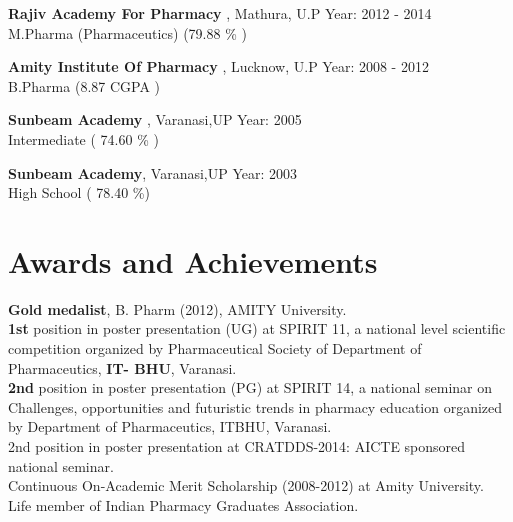 \documentclass[margin,line]{res}
\begin{document}
\begin{resume}
{\bf Rajiv Academy For Pharmacy} , Mathura, U.P \hfill Year: 2012 - 2014\\
M.Pharma (Pharmaceutics) \hfill(79.88 \% )

{\bf Amity Institute Of Pharmacy} , Lucknow, U.P \hfill Year: 2008 - 2012\\
B.Pharma \hfill(8.87 CGPA )

{\bf Sunbeam Academy }, Varanasi,UP \hfill Year: 2005 \\
Intermediate \hfill( 74.60 \% )

{\bf Sunbeam Academy}, Varanasi,UP \hfill Year: 2003 \\
High School \hfill( 78.40 \%)
\\






\section{\sc Awards and Achievements}
\setlength{\parskip}{10pt plus 1pt minus 1pt}

{\bf Gold medalist}, B. Pharm (2012), AMITY University.\vspace{1mm}\\
{\bf 1st} position in poster presentation (UG) at SPIRIT 11, a national level scientiﬁc competition organized by Pharmaceutical Society of Department of Pharmaceutics, {\bf IT- BHU}, Varanasi.\vspace{1mm}\\
{\bf 2nd} position in poster presentation (PG) at SPIRIT 14, a national seminar on Challenges, opportunities and futuristic trends in pharmacy education organized by Department of Pharmaceutics, ITBHU, Varanasi.\vspace{1mm}\\
2nd position in poster presentation at CRATDDS-2014: AICTE sponsored national seminar.\vspace{1mm}\\
Continuous On-Academic Merit Scholarship (2008-2012) at Amity University.\vspace{1mm}\\
Life member of Indian Pharmacy Graduates Association.\\





\end{resume}
\end{document}
